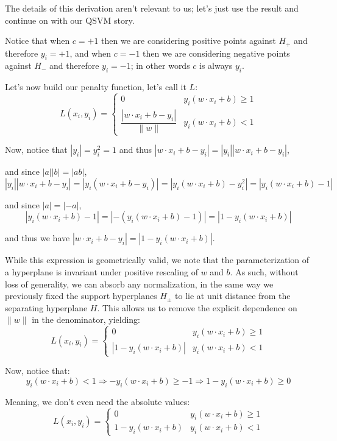 \documentclass[12pt,a4paper]{article}
\begin{document}
The details of this derivation aren't relevant to us; let's just use the result and continue on with our QSVM story.

Notice that when $c = +1$ then we are considering positive points against $H_+$ and therefore $y_i = +1$, and when $c = -1$ then we are considering negative points against $H_-$ and therefore $y_i = -1$; in other words $c$ is always $y_i$.

Let's now build our penalty function, let's call it $L$:
\[
L(x_i, y_i) = \begin{cases} 0 & y_i(w \cdot x_i + b) \geq 1 \\ \dfrac{|w \cdot x_i + b - y_i|}{\|w\|} & y_i(w \cdot x_i + b) < 1 \end{cases}
\]

Now, notice that $|y_i| = y_i^2 = 1$ and thus $|w \cdot x_i + b - y_i| = |y_i||w \cdot x_i + b - y_i|$,

and since $|a||b| = |ab|$,
\[
|y_i||w \cdot x_i + b - y_i| = |y_i(w \cdot x_i + b - y_i)| = \left|y_i(w \cdot x_i + b) - y_i^2\right| = |y_i(w \cdot x_i + b) - 1|
\]

and since $|a| = |-a|$,
\[
|y_i(w \cdot x_i + b) - 1| = |-(y_i(w \cdot x_i + b) - 1)| = |1 - y_i(w \cdot x_i + b)|
\]

and thus we have $|w \cdot x_i + b - y_i| = |1 - y_i(w \cdot x_i + b)|$.

While this expression is geometrically valid, we note that the parameterization of a hyperplane is invariant under positive rescaling of $w$ and $b$. As such, without loss of generality, we can absorb any normalization, in the same way we previously fixed the support hyperplanes $H_{\pm}$ to lie at unit distance from the separating hyperplane $H$. This allows us to remove the explicit dependence on $\|w\|$ in the denominator, yielding:
\[
L(x_i, y_i) = \begin{cases} 0 & y_i(w \cdot x_i + b) \geq 1 \\ |1 - y_i(w \cdot x_i + b)| & y_i(w \cdot x_i + b) < 1 \end{cases}
\]

Now, notice that:
\[
y_i(w \cdot x_i + b) < 1 \Rightarrow -y_i(w \cdot x_i + b) \geq -1 \Rightarrow 1 - y_i(w \cdot x_i + b) \geq 0
\]

Meaning, we don't even need the absolute values:
\[
L(x_i, y_i) = \begin{cases} 0 & y_i(w \cdot x_i + b) \geq 1 \\ 1 - y_i(w \cdot x_i + b) & y_i(w \cdot x_i + b) < 1 \end{cases}
\]
\end{document}
